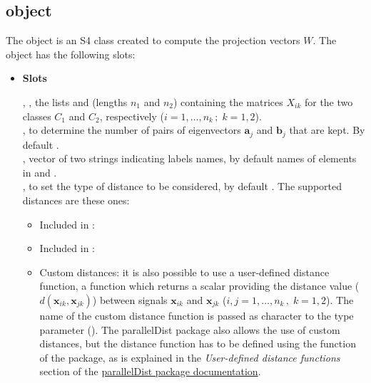 \subsection{ object}

The  object is an S4 class created to compute the projection vectors $W$. The object has the following slots:\\


\begin{itemize}
\item{\bf Slots}

, , the lists  and  (lengths $n_1$ and $n_2$) containing the matrices $X_{i k}$ for the two classes $C_1$ and $C_2$, respectively ($i=1, \ldots, n_k \, ; \; k=1,2$).\\ 

,  to determine the number of pairs of eigenvectors $\mathbf{a}_j$ and $\mathbf{b}_j$ that are kept. By default . \\

, vector of two strings indicating labels names, by default names of elements in  and .\\

, to set the type of distance to be considered, by default . The supported distances are these ones:
\begin{itemize}
     \item Included in  : 
    \item Included in  : 
    \item Custom distances: it is also possible to use a user-defined distance function, a function   which returns a scalar providing the distance value ($d(\mathbf{x}_{ik},\mathbf{x}_{jk})$) between signals $\mathbf{x}_{ik}$ and $\mathbf{x}_{jk}$ ($i, j  = 1, \ldots, n_k \, , \; k=1, 2$). The name of the custom distance function is passed as character to the type parameter (). The parallelDist package also allows the use of custom distances, but the distance function has to be defined using the  function of the  package, as  is explained in the \textit{User-defined distance functions} section of the \href{https://www.rdocumentation.org/packages/parallelDist/versions/0.2.4/topics/parDist}{parallelDist package documentation}.
\end{itemize} 
 

\end{itemize}

